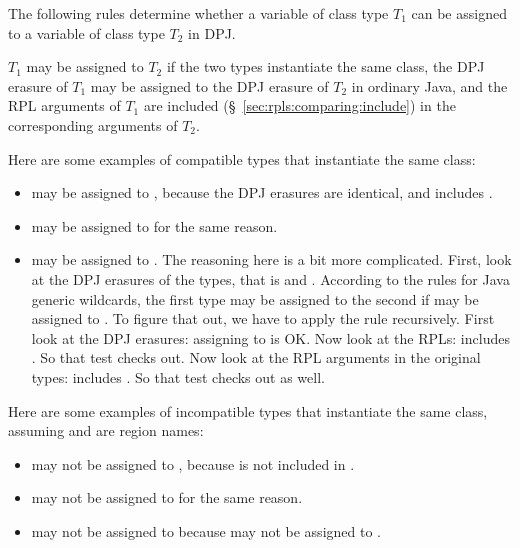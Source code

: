 The following rules determine whether a variable of class type $T_1$
can be assigned to a variable of class type $T_2$ in DPJ.

 $T_1$ may be assigned
to $T_2$ if the two types instantiate the same class, the DPJ erasure
of $T_1$ may be assigned to the DPJ erasure of $T_2$ in ordinary Java,
and the RPL arguments of $T_1$ are included
(\S~\ref{sec:rpls:comparing:include}) in the corresponding arguments
of $T_2$.

Here are some examples of compatible types that instantiate the same
class:
%
\begin{itemize}
%
\item {} may be assigned to , because the
  DPJ erasures are identical, and  includes .
%
\item {} may be assigned to 
  for the same reason.
%
\item {} may be assigned to .  The reasoning here is a bit more
  complicated.  First, look at the DPJ erasures of the types, that is
   and .
  According to the rules for Java generic wildcards, the first type
  may be assigned to the second if  may be
  assigned to .  To figure that out, we have to
  apply the rule recursively.  First look at the DPJ erasures:
  assigning  to  is OK.  Now look at the
  RPLs:  includes .  So that test checks out.
  Now look at the RPL arguments in the original types: 
  includes .  So that test checks out as well.
%
\end{itemize}
%

Here are some examples of incompatible types that instantiate the same
class, assuming  and  are region names:
%
\begin{itemize}
%
\item {} may not be assigned to , because 
is not included in .
%
\item {} may not be assigned to  for
  the same reason.
%
\item {} may not be assigned to  because  may not be
  assigned to .
%
\end{itemize}

